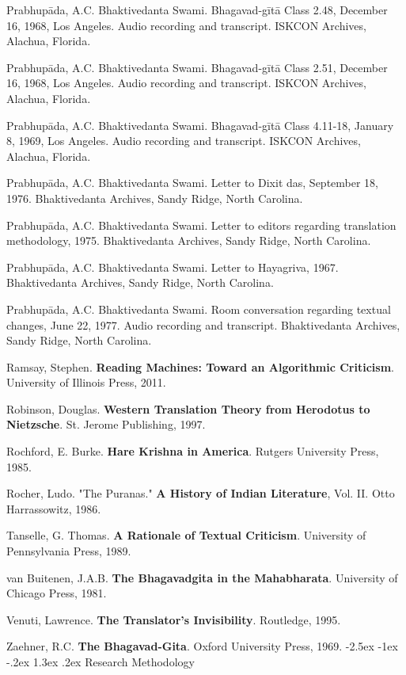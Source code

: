 \documentclass[12pt,twoside]{book}
\makeatletter
\renewcommand\section{\@startsection{section}{1}{\z@}%
{-2.5ex \@plus -1ex \@minus -.2ex}%
{1.3ex \@plus.2ex}%
{\normalfont\Large\bfseries}}
\makeatother
\begin{document}
Prabhupāda, A.C. Bhaktivedanta Swami. Bhagavad-gītā Class 2.48, December 16, 1968, Los Angeles. Audio recording and transcript. ISKCON Archives, Alachua, Florida.

Prabhupāda, A.C. Bhaktivedanta Swami. Bhagavad-gītā Class 2.51, December 16, 1968, Los Angeles. Audio recording and transcript. ISKCON Archives, Alachua, Florida.

Prabhupāda, A.C. Bhaktivedanta Swami. Bhagavad-gītā Class 4.11-18, January 8, 1969, Los Angeles. Audio recording and transcript. ISKCON Archives, Alachua, Florida.

Prabhupāda, A.C. Bhaktivedanta Swami. Letter to Dixit das, September 18, 1976. Bhaktivedanta Archives, Sandy Ridge, North Carolina.

Prabhupāda, A.C. Bhaktivedanta Swami. Letter to editors regarding translation methodology, 1975. Bhaktivedanta Archives, Sandy Ridge, North Carolina.

Prabhupāda, A.C. Bhaktivedanta Swami. Letter to Hayagriva, 1967. Bhaktivedanta Archives, Sandy Ridge, North Carolina.

Prabhupāda, A.C. Bhaktivedanta Swami. Room conversation regarding textual changes, June 22, 1977. Audio recording and transcript. Bhaktivedanta Archives, Sandy Ridge, North Carolina.

Ramsay, Stephen. \textbf{Reading Machines: Toward an Algorithmic Criticism}. University of Illinois Press, 2011.

Robinson, Douglas. \textbf{Western Translation Theory from Herodotus to Nietzsche}. St. Jerome Publishing, 1997.

Rochford, E. Burke. \textbf{Hare Krishna in America}. Rutgers University Press, 1985.

Rocher, Ludo. "The Puranas." \textbf{A History of Indian Literature}, Vol. II. Otto Harrassowitz, 1986.

Tanselle, G. Thomas. \textbf{A Rationale of Textual Criticism}. University of Pennsylvania Press, 1989.

van Buitenen, J.A.B. \textbf{The Bhagavadgita in the Mahabharata}. University of Chicago Press, 1981.

Venuti, Lawrence. \textbf{The Translator's Invisibility}. Routledge, 1995.

Zaehner, R.C. \textbf{The Bhagavad-Gita}. Oxford University Press, 1969.
\section{Research Methodology}
\label{sec:org23835ab}
\end{document}

